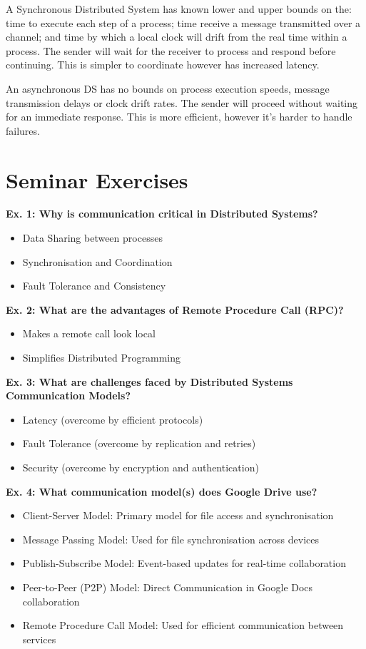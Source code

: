 
A Synchronous Distributed System has known lower and upper bounds on the: time to execute each step of a process; time receive a message transmitted over a channel; and time by which a local clock will drift from the real time within a process. The sender will wait for the receiver to process and respond before continuing. This is simpler to coordinate however has increased latency. 

An asynchronous DS has no bounds on process execution speeds, message transmission delays or clock drift rates. The sender will proceed without waiting for an immediate response. This is more efficient, however it's harder to handle failures.

\section{Seminar Exercises}
\textbf{Ex. 1: Why is communication critical in Distributed Systems?}

\begin{itemize}
    \item Data Sharing between processes
    \item Synchronisation and Coordination
    \item Fault Tolerance and Consistency
\end{itemize}

\textbf{Ex. 2: What are the advantages of Remote Procedure Call (RPC)?}

\begin{itemize}
    \item Makes a remote call look local
    \item Simplifies Distributed Programming
\end{itemize}


\textbf{Ex. 3: What are challenges faced by Distributed Systems Communication Models?}
\begin{itemize}
    \item Latency (overcome by efficient protocols)
    \item Fault Tolerance (overcome by replication and retries)
    \item Security (overcome by encryption and authentication)
\end{itemize}

\textbf{Ex. 4: What communication model(s) does Google Drive use?}
\begin{itemize}
    \item Client-Server Model: Primary model for file access and synchronisation
    \item Message Passing Model: Used for file synchronisation across devices
    \item Publish-Subscribe Model: Event-based updates for real-time collaboration
    \item Peer-to-Peer (P2P) Model: Direct Communication in Google Docs collaboration
    \item Remote Procedure Call Model: Used for efficient communication between services
\end{itemize}

